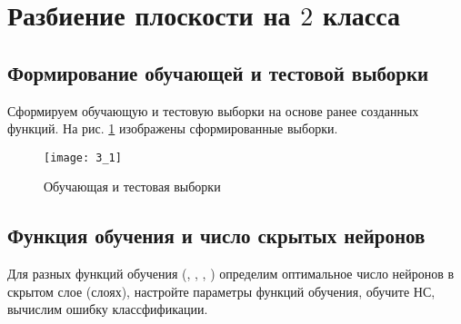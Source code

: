 \newpage

\section{Разбиение плоскости на $2$ класса}

\subsection{Формирование обучающей и тестовой выборки}

Сформируем обучающую и тестовую выборки на основе ранее созданных функций. На рис. \ref{fig:3_1} изображены сформированные выборки.
\begin{figure}[H]
\begin{center}
	\texttt{[image: 3\_1]}
	\caption{Обучающая и тестовая выборки}
	\label{fig:3_1}
\end{center}
\end{figure}

\subsection{Функция обучения и число скрытых нейронов}
\label{sec:inner_neurons}

Для разных функций обучения (, , , ) определим оптимальное число нейронов в скрытом слое (слоях), настройте параметры функций обучения, обучите НС, вычислим ошибку классфификации.

